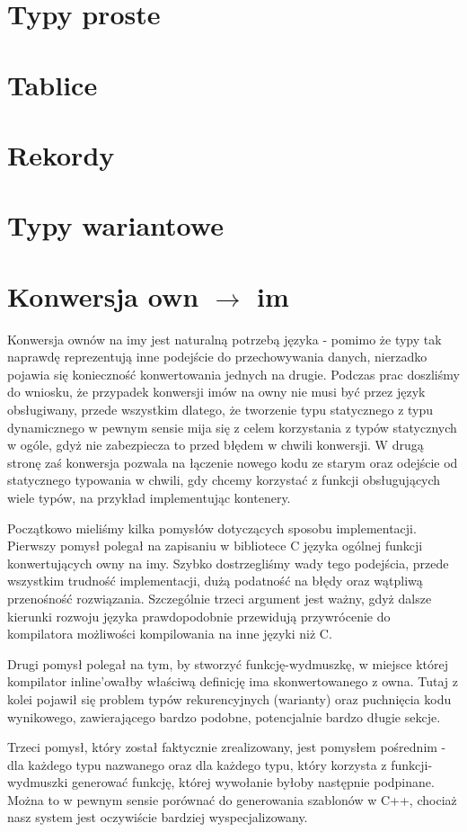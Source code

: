 \documentclass[licencjacka]{pracamgr}
\begin{document}
\section{Typy proste}
\section{Tablice}
\section{Rekordy}
\section{Typy wariantowe}
\section{Konwersja own $\rightarrow$ im}
Konwersja ownów na imy jest naturalną potrzebą języka - pomimo że typy tak naprawdę reprezentują inne podejście do przechowywania danych, nierzadko pojawia się konieczność konwertowania jednych na drugie.
Podczas prac doszliśmy do wniosku, że przypadek konwersji imów na owny nie musi być przez język obsługiwany, przede wszystkim dlatego,
że tworzenie typu statycznego z typu dynamicznego w pewnym sensie mija się z celem korzystania z typów statycznych w ogóle,
gdyż nie zabezpiecza to przed błędem w chwili konwersji.
W drugą stronę zaś konwersja pozwala na łączenie nowego kodu ze starym oraz odejście od statycznego typowania w chwili,
gdy chcemy korzystać z funkcji obsługujących wiele typów, na przykład implementując kontenery.

Początkowo mieliśmy kilka pomysłów dotyczących sposobu implementacji. Pierwszy pomysł polegał na zapisaniu w bibliotece C języka ogólnej funkcji konwertujących owny na imy.
Szybko dostrzegliśmy wady tego podejścia, przede wszystkim trudność implementacji, dużą podatność na błędy oraz wątpliwą przenośność rozwiązania.
Szczególnie trzeci argument jest ważny, gdyż dalsze kierunki rozwoju języka prawdopodobnie przewidują przywrócenie do kompilatora możliwości kompilowania na inne języki niż C.

Drugi pomysł polegał na tym, by stworzyć funkcję-wydmuszkę, w miejsce której kompilator inline'owałby właściwą definicję ima skonwertowanego z owna.
Tutaj z kolei pojawił się problem typów rekurencyjnych (warianty) oraz puchnięcia kodu wynikowego, zawierającego bardzo podobne, potencjalnie bardzo długie sekcje.

Trzeci pomysł, który został faktycznie zrealizowany, jest pomysłem pośrednim - dla każdego typu nazwanego oraz dla każdego typu, który korzysta z funkcji-wydmuszki generować funkcję,
której wywołanie byłoby następnie podpinane. Można to w pewnym sensie porównać do generowania szablonów w C++, chociaż nasz system jest oczywiście bardziej wyspecjalizowany.
\end{document}
